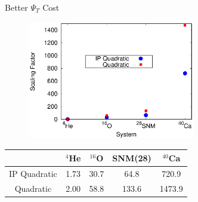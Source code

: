 \documentclass{beamer}
\begin{document}
\begin{frame}{Better $\Psi_T$ Cost}
\begin{figure}[h]
   \centering
   \includegraphics[width=0.65\textwidth]{figures/scaling.eps}
\end{figure}
\vspace{-0.2cm}
\begin{table}[h!]
   \centering
   \begin{tabular}{ccccc}
      \hline \hline
       & $^{4}$He & $^{16}$O & SNM(28) & $^{40}$Ca \\
      \hline
      IP Quadratic & 1.73 & 30.7 & 64.8 & 720.9 \\
      Quadratic & 2.00 & 58.8 & 133.6 & 1473.9 \\
      \hline \hline
   \end{tabular}
\end{table}
\end{frame}
\end{document}
